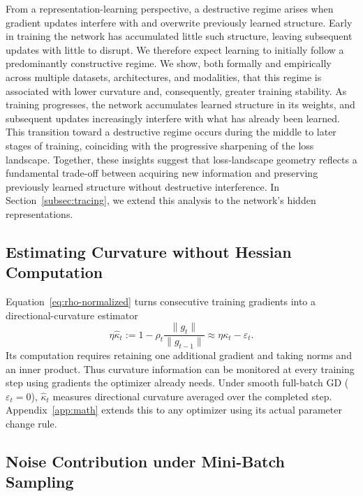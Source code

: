 From a representation-learning perspective, a destructive regime arises when gradient updates interfere with and overwrite previously learned structure. Early in training the network has accumulated little such structure, leaving subsequent updates with little to disrupt. We therefore expect learning to initially follow a predominantly constructive regime. We show, both formally and empirically across multiple datasets, architectures, and modalities, that this regime is associated with lower curvature and, consequently, greater training stability. As training progresses, the network accumulates learned structure in its weights, and subsequent updates increasingly interfere with what has already been learned. This transition toward a destructive regime occurs during the middle to later stages of training, coinciding with the progressive sharpening of the loss landscape. Together, these insights suggest that loss-landscape geometry reflects a fundamental trade-off between acquiring new information and preserving previously learned structure without destructive interference. In Section~\ref{subsec:tracing}, we extend this analysis to the network's hidden representations.

\subsection{Estimating Curvature without Hessian Computation}
\label{subsec:curvature-diagnostic}

Equation~\eqref{eq:rho-normalized} turns consecutive training gradients into a directional-curvature estimator
\begin{equation}
  \eta\widehat\kappa_t
  :=1-\rho_t\frac{\|g_t\|}{\|g_{t-1}\|}
   \approx\eta\kappa_t-\varepsilon_t.
\label{eq:kappa-estimate}
\end{equation}
Its computation requires retaining one additional gradient and taking norms and an inner product. Thus curvature information can be monitored at every training step using gradients the optimizer already needs. Under smooth full-batch GD ($\varepsilon_t=0$), $\widehat\kappa_t$ measures directional curvature averaged over the completed step. Appendix~\ref{app:math} extends this to any optimizer using its actual parameter change rule.

\subsection{Noise Contribution under Mini-Batch Sampling}
\label{subsec:sampling-noise}

